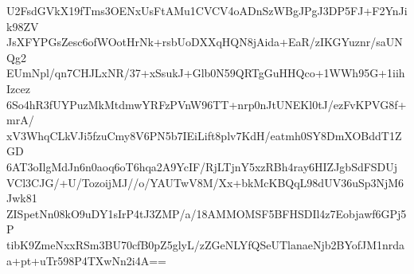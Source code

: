 U2FsdGVkX19fTms3OENxUsFtAMu1CVCV4oADnSzWBgJPgJ3DP5FJ+F2YnJik98ZV
JsXFYPGsZesc6ofWOotHrNk+rsbUoDXXqHQN8jAida+EaR/zIKGYuznr/saUNQg2
EUmNpl/qn7CHJLxNR/37+xSsukJ+Glb0N59QRTgGuHHQco+1WWh95G+1iihIzcez
6So4hR3fUYPuzMkMtdmwYRFzPVnW96TT+nrp0nJtUNEKl0tJ/ezFvKPVG8f+mrA/
xV3WhqCLkVJi5fzuCmy8V6PN5b7IEiLift8plv7KdH/eatmh0SY8DmXOBddT1ZGD
6AT3oIlgMdJn6n0aoq6oT6hqa2A9YcIF/RjLTjnY5xzRBh4ray6HIZJgbSdFSDUj
VCl3CJG/+U/TozoijMJ//o/YAUTwV8M/Xx+bkMcKBQqL98dUV36uSp3NjM6Jwk81
ZISpetNn08kO9uDY1sIrP4tJ3ZMP/a/18AMMOMSF5BFHSDIl4z7Eobjawf6GPj5P
tibK9ZmeNxxRSm3BU70cfB0pZ5glyL/zZGeNLYfQSeUTlanaeNjb2BYofJM1nrda
a+pt+uTr598P4TXwNn2i4A==
